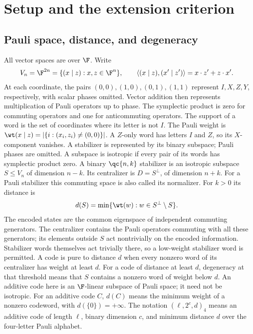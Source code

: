 \section{Setup and the extension criterion}\label{sec:extension}

\subsection{Pauli space, distance, and degeneracy}

All vector spaces are over \(\F\). Write
\[
 V_n=\F^{2n}=\{(x\mid z):x,z\in\F^n\},\qquad
 \langle(x\mid z),(x'\mid z')\rangle=x\cdot z'+z\cdot x'.
\]
At each coordinate, the pairs \((0,0),(1,0),(0,1),(1,1)\) represent
\(I,X,Z,Y\), respectively, with scalar phases omitted. Vector addition
then represents multiplication of Pauli operators up to phase. The
symplectic product is zero for commuting operators and one for
anticommuting operators. The support of a word is the set of coordinates
where its letter is not \(I\).
The Pauli weight is \(\wt(x\mid z)=|\{i:(x_i,z_i)\ne(0,0)\}|\).
A \(Z\)-only word has letters \(I\) and \(Z\), so its \(X\)-component vanishes.
A stabilizer is represented by its binary subspace; Pauli phases are omitted.
A subspace is isotropic if every pair of its words has symplectic product zero.
A binary \(\qc{n,k}\) stabilizer is an isotropic subspace
\(S\leq V_n\) of dimension \(n-k\). Its centralizer is \(D=S^\perp\),
of dimension \(n+k\). For a Pauli stabilizer this commuting space is
also called its normalizer. For \(k>0\) its distance is
\[
 d(S)=\min\{\wt(w):w\in S^\perp\setminus S\}.
\]
The encoded states are the common eigenspace of independent commuting
generators. The centralizer contains the Pauli operators commuting with
all these generators; its elements outside \(S\) act nontrivially on
the encoded information. Stabilizer words themselves act trivially there,
so a low-weight stabilizer word is permitted. A code is pure to distance
\(d\) when every nonzero word of its centralizer has weight at least \(d\).
For a code of distance at least \(d\), degeneracy at that threshold
means that \(S\) contains a nonzero word of weight below \(d\).
An additive code here is an \(\F\)-linear subspace of Pauli space;
it need not be isotropic. For an additive code \(C\), \(d(C)\) means the
minimum weight of a nonzero codeword, with \(d(\{0\})=+\infty\).
The notation \((\ell,2^c,d)_4\) means an additive code of length
\(\ell\), binary dimension \(c\), and minimum distance \(d\) over
the four-letter Pauli alphabet.

